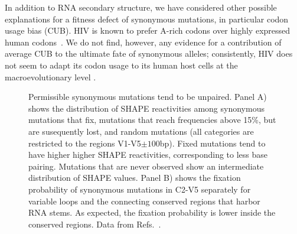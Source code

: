 \documentclass[rmp, twocolumn]{revtex4}
\newcommand{\shankaregion}{C2-V5}
\begin{document}
In addition to RNA secondary structure, we have considered other possible
explanations for a fitness defect of synonymous mutations, in particular codon
usage bias (CUB). HIV is known to prefer A-rich codons over highly expressed
human codons~\citep{jenkins_extent_2003,kuyl_biased_2012}. We do not find,
however, any evidence for a contribution of average CUB to the ultimate fate of
synonymous alleles; consistently, HIV does not seem to adapt its codon usage to
its human host cells at the macroevolutionary level \citep{kuyl_biased_2012}.

\begin{figure}
\begin{center}
\caption{Permissible synonymous mutations tend to be unpaired.
Panel A) shows the distribution of SHAPE reactivities among synonymous mutations
that fix, mutations that reach frequencies above 15\%, but
are susequently lost, and random mutations (all categories are restricted to the
regions V1-V5$\pm 100$bp).
Fixed mutations tend to have higher higher SHAPE reactivities, corresponding to
less base pairing.
Mutations that are never observed show an intermediate distribution of SHAPE values.
Panel B) shows the fixation probability of synonymous mutations in
\shankaregion{} separately for variable loops and the connecting conserved regions that
harbor RNA stems. As expected, the fixation probability is lower
inside the conserved regions. Data from Refs.~\cite{shankarappa_consistent_1999,
bunnik_autologous_2008, liu_selection_2006}.}
\label{fig:SHAPE}
\end{center}
\end{figure}
\end{document}

